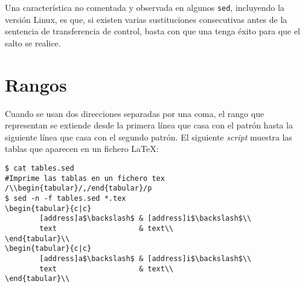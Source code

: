 Una característica no comentada y observada en algunos \verb|sed|, incluyendo 
la versión Linux, es que, si existen varias sustituciones consecutivas antes de la
sentencia de transferencia de control, basta con que una tenga éxito para que el salto
se realice. 

\section{Rangos}
Cuando se usan dos direcciones separadas por una coma, el rango que
representan se extiende desde la primera línea que casa con el patrón
hasta la siguiente línea que casa con el segundo patrón.
El siguiente {\it script} muestra las tablas que aparecen en un fichero \LaTeX:
\begin{verbatim}
$ cat tables.sed
#Imprime las tablas en un fichero tex
/\\begin{tabular}/,/end{tabular}/p
$ sed -n -f tables.sed *.tex
\begin{tabular}{c|c}
        [address]a$\backslash$ & [address]i$\backslash$\\
        text                   & text\\
\end{tabular}\\
\begin{tabular}{c|c}
        [address]a$\backslash$ & [address]i$\backslash$\\
        text                   & text\\
\end{tabular}\\        
\end{verbatim}

